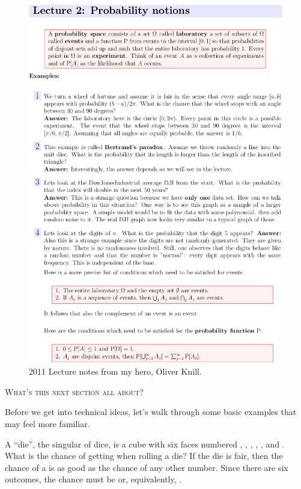 \documentclass{ccg-topic}
\author{Diez, \c{C}etinkaya-Rundel, Barr (edited by Colton)}
\date{\today}
\begin{document}
\setcounter{section}{1}
\newcommand{\answer}[1]{\color{blue}#1}
\renewcommand{\chapterfolder}{ch_probability}


\frontstuff
\begin{figure}[htpb]
    \centering
    \includegraphics[width=0.57\linewidth]{2019-09-17-probability-notions.png}
    \caption{2011 Lecture notes from my hero, Oliver Knill.}
    \label{fig:2019-09-17-probability-notions}
\end{figure}
\printindex

\vspace{1em}\noindent\textsc{What's this next section all about?} 
\vspace{1em}

Before we get into technical ideas, let's walk through
some basic examples that may feel more familiar.

\begin{ex}{A ``die'', the singular of dice, is a cube with six faces numbered , , , , , and . What is the chance of getting  when rolling a die?}\label{probOf1}
If the die is fair, then the chance of a  is as good as the chance of any other number. Since there are six outcomes, the chance must be  or, equivalently, .
\end{ex}
\end{document}
